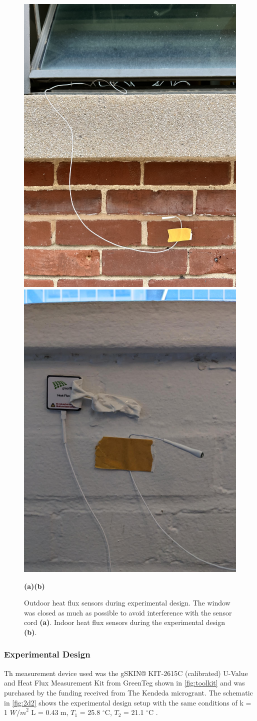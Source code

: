 \begin{figure}[htb]
    \centering
    \includegraphics[width=0.495\linewidth]{Figures/expfig1.jpg}
    \includegraphics[width=0.495\linewidth]{Figures/expfig2.jpg}

    \hspace{3.5cm}\textbf{(a)}\hfill\textbf{(b)}\hspace{3.7cm}

     \caption[Experimental heat flux measurement setup]{Outdoor heat flux sensors during experimental design. The window was closed as much as possible to avoid interference with the sensor cord \textbf{(a)}. Indoor heat flux sensors during the experimental design \textbf{(b)}.}
   \label{fig:figexp1}
 \end{figure}




 
\subsubsection{Experimental Design}
 Th  measurement device used was the gSKIN® KIT-2615C (calibrated) U-Value and Heat Flux Measurement Kit from GreenTeg  \cite{greenteg} shown in \ref{fig:toolkit} and was purchased by the funding received from The Kendeda microgrant\cite{kendeda}.
 The schematic in \cref{fig:2d2} shows the experimental design setup with the same conditions of k  = 1 ${W/m}^2$ 
L  = 0.43 m,
$T_1$ = 25.8 $^\circ \text{C}$, 
$T_2$  = 21.1  $^\circ \text{C}$ .

